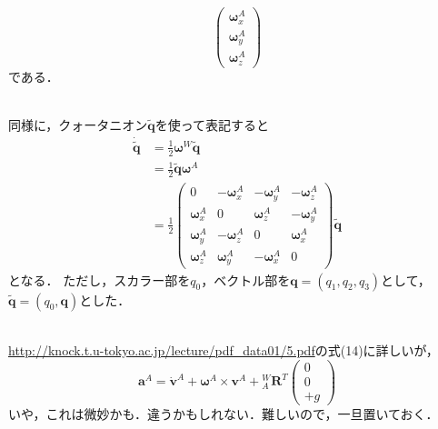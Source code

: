 \begin{description}
\begin{equation}
    \begin{pmatrix}
      \boldsymbol{\omega}^{A}_{x}\\
      \boldsymbol{\omega}^{A}_{y}\\
      \boldsymbol{\omega}^{A}_{z}
    \end{pmatrix}
  \end{equation}
  である．
\item[\fullref{subsec:quat}]\mbox{}\\
  同様に，クォータニオン$\tilde{\boldsymbol{q}}$を使って表記すると
  \begin{align}
    \dot{\tilde{\boldsymbol{q}}} & = \frac{1}{2}\boldsymbol{\omega}^{W}\tilde{\boldsymbol{q}}\\
    & = \frac{1}{2}\tilde{\boldsymbol{q}}\boldsymbol{\omega}^{A}\\
    & = \frac{1}{2}
    \begin{pmatrix}
      0                           & - \boldsymbol{\omega}^{A}_{x} & - \boldsymbol{\omega}^{A}_{y} & - \boldsymbol{\omega}^{A}_{z}\\
      \boldsymbol{\omega}^{A}_{x} & 0                             &   \boldsymbol{\omega}^{A}_{z} & - \boldsymbol{\omega}^{A}_{y}\\
      \boldsymbol{\omega}^{A}_{y} & - \boldsymbol{\omega}^{A}_{z} & 0                             &   \boldsymbol{\omega}^{A}_{x}\\
      \boldsymbol{\omega}^{A}_{z} &   \boldsymbol{\omega}^{A}_{y} & - \boldsymbol{\omega}^{A}_{x} & 0
    \end{pmatrix}
    \tilde{\boldsymbol{q}}
  \end{align}
  となる．
  ただし，スカラー部を$q_0$，ベクトル部を$\boldsymbol{q} = (q_1, q_2, q_3)$として，
  $\tilde{\boldsymbol{q}} = (q_0, \boldsymbol{q})$とした．
\item[\fullref{subsec:acc}]\mbox{}\\
  \url{http://knock.t.u-tokyo.ac.jp/lecture/pdf_data01/5.pdf}の式(14)に詳しいが，
  \begin{equation}
    \boldsymbol{a}^{A} = \dot{\boldsymbol{v}}^{A} + \boldsymbol{\omega}^{A} \times \boldsymbol{v}^{A} + {}^{W}_{A}\boldsymbol{R}^{T}
    \begin{pmatrix}
      0\\
      0\\
      +g
    \end{pmatrix}
  \end{equation}
  いや，これは微妙かも．違うかもしれない．難しいので，一旦置いておく．
\item[\fullref{subsec:quat-dcm}]\mbox{}\\

\end{description}
